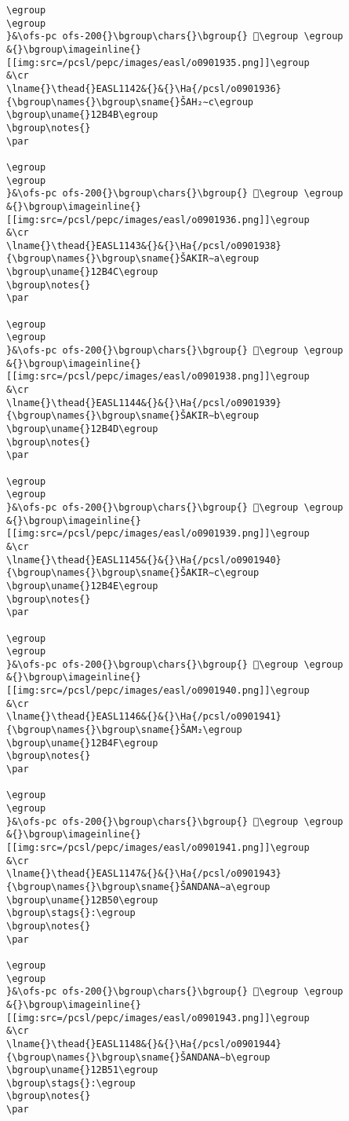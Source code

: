 \begin{verbatim}
\egroup
\egroup
}&\ofs-pc ofs-200{}\bgroup\chars{}\bgroup{} 𒭊\egroup \egroup
&{}\bgroup\imageinline{}[[img:src=/pcsl/pepc/images/easl/o0901935.png]]\egroup
&\cr
\lname{}\thead{}EASL1142&{}&{}\Ha{/pcsl/o0901936}{\bgroup\names{}\bgroup\sname{}ŠAH₂∼c\egroup
\bgroup\uname{}12B4B\egroup
\bgroup\notes{}
\par 

\egroup
\egroup
}&\ofs-pc ofs-200{}\bgroup\chars{}\bgroup{} 𒭋\egroup \egroup
&{}\bgroup\imageinline{}[[img:src=/pcsl/pepc/images/easl/o0901936.png]]\egroup
&\cr
\lname{}\thead{}EASL1143&{}&{}\Ha{/pcsl/o0901938}{\bgroup\names{}\bgroup\sname{}ŠAKIR∼a\egroup
\bgroup\uname{}12B4C\egroup
\bgroup\notes{}
\par 

\egroup
\egroup
}&\ofs-pc ofs-200{}\bgroup\chars{}\bgroup{} 𒭌\egroup \egroup
&{}\bgroup\imageinline{}[[img:src=/pcsl/pepc/images/easl/o0901938.png]]\egroup
&\cr
\lname{}\thead{}EASL1144&{}&{}\Ha{/pcsl/o0901939}{\bgroup\names{}\bgroup\sname{}ŠAKIR∼b\egroup
\bgroup\uname{}12B4D\egroup
\bgroup\notes{}
\par 

\egroup
\egroup
}&\ofs-pc ofs-200{}\bgroup\chars{}\bgroup{} 𒭍\egroup \egroup
&{}\bgroup\imageinline{}[[img:src=/pcsl/pepc/images/easl/o0901939.png]]\egroup
&\cr
\lname{}\thead{}EASL1145&{}&{}\Ha{/pcsl/o0901940}{\bgroup\names{}\bgroup\sname{}ŠAKIR∼c\egroup
\bgroup\uname{}12B4E\egroup
\bgroup\notes{}
\par 

\egroup
\egroup
}&\ofs-pc ofs-200{}\bgroup\chars{}\bgroup{} 𒭎\egroup \egroup
&{}\bgroup\imageinline{}[[img:src=/pcsl/pepc/images/easl/o0901940.png]]\egroup
&\cr
\lname{}\thead{}EASL1146&{}&{}\Ha{/pcsl/o0901941}{\bgroup\names{}\bgroup\sname{}ŠAM₂\egroup
\bgroup\uname{}12B4F\egroup
\bgroup\notes{}
\par 

\egroup
\egroup
}&\ofs-pc ofs-200{}\bgroup\chars{}\bgroup{} 𒭏\egroup \egroup
&{}\bgroup\imageinline{}[[img:src=/pcsl/pepc/images/easl/o0901941.png]]\egroup
&\cr
\lname{}\thead{}EASL1147&{}&{}\Ha{/pcsl/o0901943}{\bgroup\names{}\bgroup\sname{}ŠANDANA∼a\egroup
\bgroup\uname{}12B50\egroup
\bgroup\stags{}:\egroup
\bgroup\notes{}
\par 

\egroup
\egroup
}&\ofs-pc ofs-200{}\bgroup\chars{}\bgroup{} 𒭐\egroup \egroup
&{}\bgroup\imageinline{}[[img:src=/pcsl/pepc/images/easl/o0901943.png]]\egroup
&\cr
\lname{}\thead{}EASL1148&{}&{}\Ha{/pcsl/o0901944}{\bgroup\names{}\bgroup\sname{}ŠANDANA∼b\egroup
\bgroup\uname{}12B51\egroup
\bgroup\stags{}:\egroup
\bgroup\notes{}
\par 


\end{verbatim}
